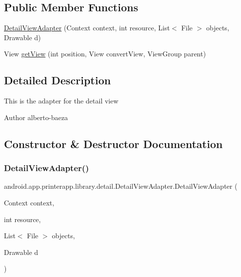 \subsection*{Public Member Functions}
\begin{DoxyCompactItemize}
\item 
\hyperlink{classandroid_1_1app_1_1printerapp_1_1library_1_1detail_1_1_detail_view_adapter_a8d579ef6a60f644ac0cb127f1de66e45}{Detail\+View\+Adapter} (Context context, int resource, List$<$ File $>$ objects, Drawable d)
\item 
View \hyperlink{classandroid_1_1app_1_1printerapp_1_1library_1_1detail_1_1_detail_view_adapter_ade238ff43ea8b4c4c145cf823e4f0493}{get\+View} (int position, View convert\+View, View\+Group parent)
\end{DoxyCompactItemize}


\subsection{Detailed Description}
This is the adapter for the detail view

\begin{DoxyAuthor}{Author}
alberto-\/baeza 
\end{DoxyAuthor}


\subsection{Constructor \& Destructor Documentation}
\mbox{\label{classandroid_1_1app_1_1printerapp_1_1library_1_1detail_1_1_detail_view_adapter_a8d579ef6a60f644ac0cb127f1de66e45}} 
\subsubsection{\texorpdfstring{Detail\+View\+Adapter()}{DetailViewAdapter()}}
{\footnotesize\ttfamily android.\+app.\+printerapp.\+library.\+detail.\+Detail\+View\+Adapter.\+Detail\+View\+Adapter (\begin{DoxyParamCaption}\item[{Context}]{context,  }\item[{int}]{resource,  }\item[{List$<$ File $>$}]{objects,  }\item[{Drawable}]{d }\end{DoxyParamCaption})}



